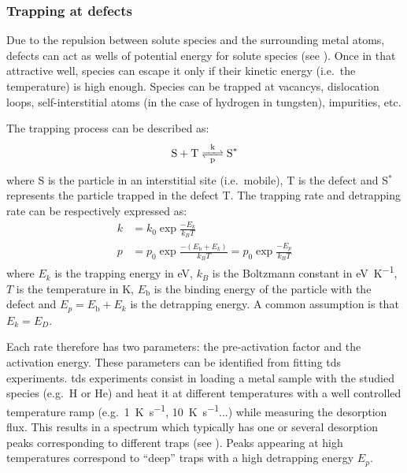 \subsubsection{Trapping at defects}

Due to the repulsion between solute species and the surrounding metal atoms, defects can act as wells of potential energy for solute species (see ).
Once in that attractive well, species can escape it only if their kinetic energy (i.e.\ the temperature) is high enough.
Species can be trapped at \glspl{vacancy}, \glspl{dislocation loop}, \gls{self-interstitial} atoms (in the case of hydrogen in tungsten), impurities, etc.

The \gls{trapping} process can be described as:
\begin{equation}
    \ce{S + T <=>[k][p] S^*}
\end{equation}
where S is the particle in an interstitial site (i.e.\ mobile), T is the defect and S$^*$ represents the particle trapped in the defect T.
The \gls{trapping} rate and \gls{detrapping} rate can be respectively expressed as:
\begin{align}
    k &= k_0 \exp{\frac{-E_k}{k_B T}} \\
    p &= p_0 \exp{\frac{-(E_\mathrm{b} + E_k)}{k_B T}} = p_0 \exp{\frac{-E_p}{k_B T}}
\end{align}
where $E_k$ is the \gls{trapping} energy in \si{eV}, $k_B$ is the Boltzmann constant in \si{eV.K^{-1}}, $T$ is the temperature in \si{K}, $E_\mathrm{b}$ is the binding energy of the particle with the defect and $E_p = E_\mathrm{b} + E_k$ is the \gls{detrapping} energy.
A common assumption is that $E_k = E_D$.

Each rate therefore has two parameters: the pre-activation factor and the activation energy.
These parameters can be identified from fitting \gls{tds} experiments.
\gls{tds} experiments consist in loading a metal sample with the studied species (e.g.\ \gls{H} or \gls{He}) and heat it at different temperatures with a well controlled temperature ramp (e.g.\ \SI{1}{K.s^{-1}}, \SI{10}{K.s^{-1}}...) while measuring the desorption flux.
This results in a spectrum which typically has one or several desorption peaks corresponding to different traps (see ).
Peaks appearing at high temperatures correspond to ``deep'' traps with a high \gls{detrapping} energy $E_p$.

